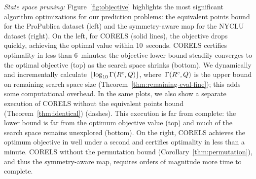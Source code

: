 \textit{State space pruning:}
Figure~\ref{fig:objective} highlights the most significant
algorithm optimizations for our prediction problems:
the equivalent points bound for the ProPublica dataset (left)
and the symmetry-aware map for the NYCLU dataset (right).
%
On the left, for CORELS (solid lines),
the objective drops quickly, achieving the optimal value within 10~seconds.
%
CORELS certifies optimality in less than 6~minutes:
the objective lower bound steadily converges to the optimal objective (top)
as the search space shrinks (bottom).
%
We dynamically and incrementally
calculate~$\lfloor \log_{10} \Gamma({R^c}, Q) \rfloor$,
where~$\Gamma({R^c}, Q)$
is the upper bound on remaining search space size
(Theorem~\ref{thm:remaining-eval-fine});
this adds some computational overhead.
%
In the same plots, we also show
a separate execution of CORELS without the equivalent points bound
(Theorem~\ref{thm:identical}) (dashes).
%
This execution is far from complete:
the lower bound is far from the optimum objective value (top)
and much of the search space remains unexplored (bottom).
%
On the right,
CORELS achieves the optimum objective in well under a second
and certifies optimality in less than a minute.
%
CORELS without the permutation bound (Corollary~\ref{thm:permutation}),
and thus the symmetry-aware map,
requires orders of magnitude more time to complete.

